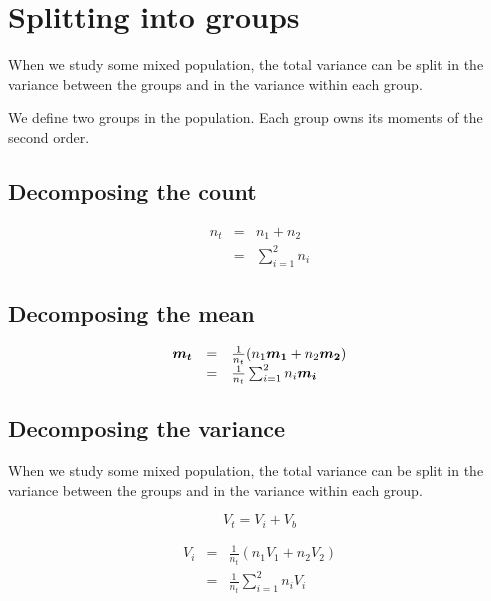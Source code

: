 \documentclass{article}
\begin{document}
\section{Splitting into groups}
When we study some mixed population, the total variance can be split in
the variance between the groups and in the variance within each group.

We define two groups in the population. Each group owns its moments of the 
second order.

\subsection{Decomposing the count}

\[
\begin{array}{lcl}
n_t & = & n_1 + n_2 \\
    & = & \sum_{i=1}^{2} n_i
\end{array}
\]


\subsection{Decomposing the mean}

\[
\begin{array}{lcl}
\mbox{\boldmath$m_t$} & = & 
 \frac{1}{n_t}(n_1 \mbox{\boldmath$m_1$} + n_2 \mbox{\boldmath$m_2$}) \\
                      & = &
 \frac{1}{n_t}\sum_{i=1}^{2} n_i \mbox{\boldmath$m_i$}
\end{array}
\]


\subsection{Decomposing the variance}
When we study some mixed population, the total variance can be split in
the variance between the groups and in the variance within each group.

\[
V_t = V_i + V_b
\]

\[
\begin{array}{lcl}
V_i & = & \frac{1}{n_t}(n_1 V_1 + n_2 V_2) \\
    & = & \frac{1}{n_t}\sum_{i=1}^2 n_i V_i
\end{array}
\]
\end{document}
